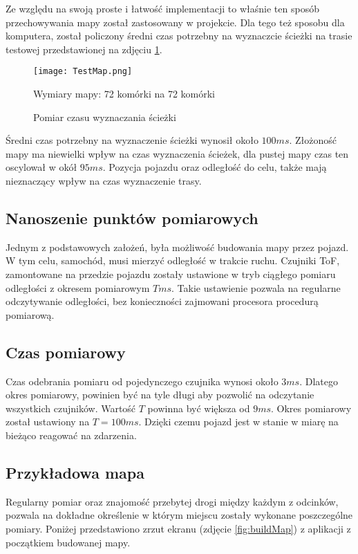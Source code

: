             Ze względu na swoją proste i łatwość implementacji to właśnie ten sposób przechowywania mapy został zastosowany w projekcie.
            Dla tego też sposobu dla komputera, został policzony średni czas potrzebny na wyznaczcie ścieżki na trasie testowej przedstawionej na zdjęciu \ref{fig:pathFindingTime}.
            \begin{figure}
                \centering
                \texttt{[image: TestMap.png]}
                \caption{Pomiar czasu wyznaczania ścieżki}
                Wymiary mapy: 72 komórki na 72 komórki
                \label{fig:pathFindingTime}
            \end{figure}

            Średni czas potrzebny na wyznaczenie ścieżki wynosił około $100ms$.
            Złożoność mapy ma niewielki wpływ na czas wyznaczenia ścieżek, dla pustej mapy czas ten oscylował w okół $95ms$.
            Pozycja pojazdu oraz odległość do celu, także mają nieznaczący wpływ na czas wyznaczenie trasy.

    \subsection{Nanoszenie punktów pomiarowych}
        Jednym z podstawowych założeń, była możliwość budowania mapy przez pojazd.
        W tym celu, samochód, musi mierzyć odległość w trakcie ruchu.
        Czujniki ToF, zamontowane na przedzie pojazdu zostały ustawione w tryb ciągłego pomiaru odległości z okresem pomiarowym $T ms$.
        Takie ustawienie pozwala na regularne odczytywanie odległości, bez konieczności zajmowani procesora procedurą pomiarową.

        \subsection{Czas pomiarowy}
            Czas odebrania pomiaru od pojedynczego czujnika wynosi około $3ms$.
            Dlatego okres pomiarowy, powinien być na tyle długi aby pozwolić na odczytanie wszystkich czujników.
            Wartość $T$ powinna być większa od $9ms$.
            Okres pomiarowy został ustawiony na $T = 100ms$.
            Dzięki czemu pojazd jest w stanie w miarę na bieżąco reagować na zdarzenia.

        \subsection{Przykładowa mapa}
            Regularny pomiar oraz znajomość przebytej drogi między każdym z odcinków, pozwala na dokładne określenie w którym miejscu zostały wykonane poszczególne pomiary.
            Poniżej przedstawiono zrzut ekranu (zdjęcie \ref{fig:buildMap}) z aplikacji z początkiem budowanej mapy.

